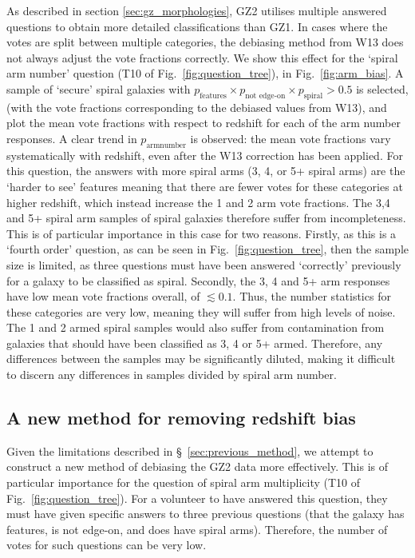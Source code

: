 \documentclass[useAMS,usenatbib]{mn2e}
\begin{document}
As described in section \ref{sec:gz_morphologies}, GZ2 utilises multiple answered questions to obtain more detailed classifications than GZ1. In cases where the votes are split between multiple categories, the debiasing method from W13 does not always adjust the vote fractions correctly. We show this effect for the `spiral arm number' question (T10 of Fig.~\ref{fig:question_tree}), in Fig.~\ref{fig:arm_bias}. A sample of `secure' spiral galaxies with $p_{\textrm{features}} \times p_{\textrm{not edge-on}} \times p_{\textrm{spiral}} > 0.5$ is selected, (with the vote fractions corresponding to the debiased values from W13), and plot the mean vote fractions with respect to redshift for each of the arm number responses. A clear trend in $p_\mathrm{arm number}$ is observed: the mean vote fractions vary systematically with redshift, even after the W13 correction has been applied. For this question, the answers with more spiral arms (3, 4, or 5+ spiral arms) are the `harder to see' features meaning that there are fewer votes for these categories at higher redshift, which instead increase the 1 and 2 arm vote fractions. The 3,4 and 5+ spiral arm samples of spiral galaxies therefore suffer from incompleteness. This is of particular importance in this case for two reasons. Firstly, as this is a `fourth order' question, as can be seen in Fig.~\ref{fig:question_tree}, then the sample size is limited, as three questions must have been answered `correctly' previously for a galaxy to be classified as spiral. Secondly, the 3, 4 and 5+ arm responses have low mean vote fractions overall, of $\lesssim 0.1$. Thus, the number statistics for these categories are very low, meaning they will suffer from high levels of noise. The 1 and 2 armed spiral samples would also suffer from contamination from galaxies that should have been classified as 3, 4 or 5+ armed. Therefore, any differences between the samples may be significantly diluted, making it difficult to discern any differences in samples divided by spiral arm number. 


\subsection{A new method for removing redshift bias}
\label{sec:new_method}

Given the limitations described in \S~\ref{sec:previous_method}, we attempt to construct a new method of debiasing the GZ2 data more effectively. This is of particular importance for the question of spiral arm multiplicity (T10 of Fig.~\ref{fig:question_tree}). For a volunteer to have answered this question, they must have given specific answers to three previous questions (that the galaxy has features, is not edge-on, and does have spiral arms). Therefore, the number of votes for such questions can be very low. 
\end{document}
